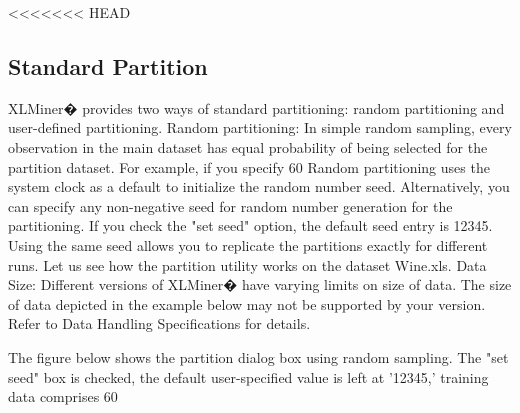 <<<<<<< HEAD
\subsection{Standard Partition}
XLMiner� provides two ways of standard partitioning: random partitioning and user-defined partitioning.
Random partitioning: In simple random sampling, every observation in the main dataset has equal probability of being selected for the partition dataset. For example, if you specify 60%
Random partitioning uses the system clock as a default to initialize the random number seed. Alternatively, you can specify any non-negative seed for random number generation for the partitioning. If you check the "set seed" option, the default seed entry is 12345. 
Using the same seed allows you to replicate the partitions exactly for different runs. 
Let us see how the partition utility works on the dataset Wine.xls.
Data Size: Different versions of XLMiner�  have varying limits on size of data. The size of data depicted in the example below may not be supported by your version. Refer to Data Handling Specifications for details.

The figure below shows the partition dialog box using random sampling. The "set seed" box is checked, the default user-specified value is left at '12345,' training data comprises 60%

